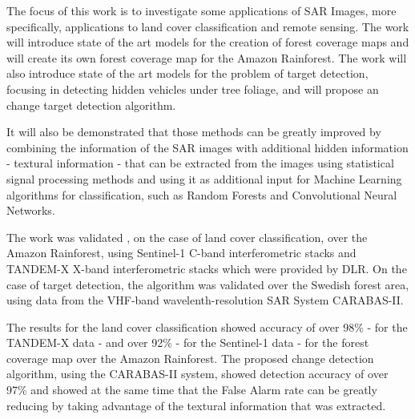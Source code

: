 The focus of this work is to investigate some applications of SAR Images, more specifically, applications to land cover classification and remote sensing.
The work will introduce state of the art models for the creation of forest coverage maps and will create its own forest coverage map for the Amazon Rainforest.
The work will also introduce state of the art models for the problem of target detection, focusing in detecting hidden vehicles under tree foliage, and will propose an change target detection algorithm.

It will also be demonstrated that those methods can be greatly improved by combining the information of the SAR images with additional hidden information - textural information - that can be extracted from the images
using statistical signal processing methods and using it as additional input for Machine Learning algorithms for classification, such as Random Forests and Convolutional Neural Networks. 

The work was validated , on the case of land cover classification, over the Amazon Rainforest, using Sentinel-1 C-band interferometric stacks and TANDEM-X X-band interferometric stacks which were provided by DLR.
On the case of target detection, the algorithm was validated over the Swedish forest area, using data from the VHF-band wavelenth-resolution SAR System CARABAS-II.

The results for the land cover classification showed accuracy of over 98\% - for the TANDEM-X data -  and over 92\% - for the Sentinel-1 data - for the forest coverage map over the Amazon Rainforest.
The proposed change detection algorithm, using the CARABAS-II system, showed detection accuracy of over 97\% and showed at the same time  that the False Alarm rate can be greatly reducing by taking advantage of the textural information that was extracted.
